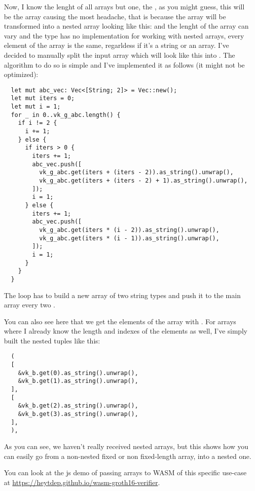 \documentclass{article}
\begin{document}
Now, I know the lenght of all arrays but one, the , as you might guess, this will be the array causing the most headache, that is because the array will be transformed into a nested array looking like this: \inl{[[a_1, b_1], [a_2, b_2]]} and the lenght of the array can vary and the  type has no implementation for working with nested arrays, every element of the array is the same, regarldess if it's a string or an array. I've decided to manually split the input array which will look like this \inl{[a_1, b_1, a_2, b_2, ...]} into \inl{[[a_1, b_1], [a_2, b_2], ...]}. The algorithm to do so is simple and I've implemented it as follows (it might not be optimized):

\begin{lstlisting}
  let mut abc_vec: Vec<[String; 2]> = Vec::new();
  let mut iters = 0;
  let mut i = 1;
  for _ in 0..vk_g_abc.length() {
    if i != 2 {
      i += 1;
    } else {
      if iters > 0 {
        iters += 1;
        abc_vec.push([
          vk_g_abc.get(iters + (iters - 2)).as_string().unwrap(),
          vk_g_abc.get(iters + (iters - 2) + 1).as_string().unwrap(),
        ]);
        i = 1;
      } else {
        iters += 1;
        abc_vec.push([
          vk_g_abc.get(iters * (i - 2)).as_string().unwrap(),
          vk_g_abc.get(iters * (i - 1)).as_string().unwrap(),
        ]);
        i = 1;
      }
    }
  }
\end{lstlisting}

The loop has to build a new array of two string types and push it to the main  array every two \inl{_}.

You can also see here that we get the elements of the array with . For arrays where I already know the length and indexes of the elements as well, I've simply built the nested tuples like this:

\begin{lstlisting}
  (
  [
    &vk_b.get(0).as_string().unwrap(),
    &vk_b.get(1).as_string().unwrap(),
  ],
  [
    &vk_b.get(2).as_string().unwrap(),
    &vk_b.get(3).as_string().unwrap(),
  ],
  ),
\end{lstlisting}

As you can see, we haven't really received nested arrays, but this shows how you can easily go from a non-nested fixed or non fixed-length array, into a nested one.

You can look at the js demo of passing arrays to WASM of this specific use-case at \url{https://heytdep.github.io/wasm-groth16-verifier}.
\end{document}
